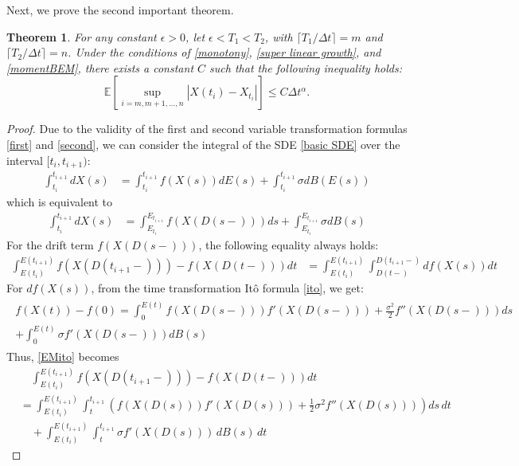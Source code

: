 \documentclass[10pt,reqno,final]{amsart}
\theoremstyle{plain}
\newtheorem{theorem}{Theorem}[section]
\theoremstyle{definition}
\theoremstyle{remark}
\numberwithin{equation}{section}
\numberwithin{figure}{section}
\numberwithin{table}{section}
\begin{document}
Next, we prove the second important theorem.
\begin{theorem}\label{main th}
	For any constant \( \epsilon > 0 \), let \( \epsilon < T_1 < T_2 \), with \( \lceil T_1 / \Delta t \rceil = m \) and \( \lceil T_2 / \Delta t \rceil = n \). Under the conditions of \cref{monotony}, \cref{super linear growth}, and \cref{momentBEM}, there exists a constant \( C \) such that the following inequality holds:
	$$ \mathbb{E}\left[\sup\limits_{i = m, m+1, \ldots, n} |X(t_i) - X_{t_i}|\right] \leq C \Delta t^\alpha. $$
\end{theorem}

\begin{proof}
	Due to the validity of the first and second variable transformation formulas \cref{first} and \cref{second}, we can consider the integral of the SDE \cref{basic SDE} over the interval \([t_i, t_{i+1})\):
	\begin{align}
		\int_{t_i}^{t_{i+1}} dX(s) &= \int_{t_i}^{t_{i+1}} f(X(s)) dE(s) + \int_{t_i}^{t_{i+1}} \sigma dB(E(s))
	\end{align}
	which is equivalent to
	\begin{align}\label{eq:5}
		\int_{t_i}^{t_{i+1}} dX(s) &= \int_{E_{t_i}}^{E_{t_{i+1}}} f(X(D(s-))) ds + \int_{E_{t_i}}^{E_{t_{i+1}}} \sigma dB(s)
	\end{align}
	For the drift term \(f(X(D(s-)))\), the following equality always holds:
	\begin{align}\label{EMito}
		\int_{E(t_i)}^{E(t_{i+1})} f(X(D(t_{i+1}-))) - f(X(D(t-))) dt &= \int_{E(t_i)}^{E(t_{i+1})} \int^{D(t_{i+1}-)}_{D(t-)} df(X(s)) dt
	\end{align}
	For \(df(X(s))\), from the time transformation It\^{o} formula \cref{ito}, we get:
	\begin{align*}
		\begin{gathered}
			f(X(t)) - f(0) = \int_{0}^{E(t)} f(X(D(s-))) f'(X(D(s-))) + \frac{\sigma^2}{2} f''(X(D(s-))) ds \\
			+ \int_{0}^{E(t)} \sigma f'(X(D(s-))) dB(s)
		\end{gathered}
	\end{align*}
	Thus, \cref{EMito} becomes
	\begin{equation}\label{EMito1}
		\begin{aligned}
			&\quad \int_{E(t_i)}^{E(t_{i+1})} f(X(D(t_{i+1}-))) - f(X(D(t-))) dt \\
			&= \int_{E(t_i)}^{E(t_{i+1})} \int_{t}^{t_{i+1}} \left( f(X(D(s))) f'(X(D(s))) + \frac{1}{2} \sigma^2 f''(X(D(s))) \right) ds \, dt \\
			&\quad + \int_{E(t_i)}^{E(t_{i+1})} \int_{t}^{t_{i+1}} \sigma f'(X(D(s))) \, dB(s) \, dt
		\end{aligned}
	\end{equation}
	

\end{proof}
\end{document}
